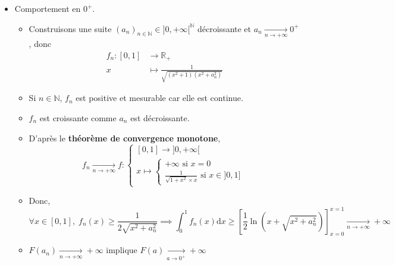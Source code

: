 \begin{myproof}{}{}
\begin{itemize}

  \item Comportement en $0 ^{+}$. 




  \begin{itemize}
    \item Construisons une suite $(a_n) _{n \in \mathbb{N}} \in ]0,+ \infty[ ^{\mathbb{N}}$ décroissante et $a_n \underset{n \to + \infty}{\longrightarrow} 0 ^{+}$, donc
        \begin{align}
          f_n : [0, 1] &\to \mathbb{R}_+ \\ 
          x &\mapsto \frac {1}{\sqrt{(x ^{2}+1 ) (x ^{2}+ a_n ^{2})}}            \end{align}

      \item Si $n \in \mathbb{N}$, $f_n$ est positive et mesurable car elle est continue. 
      \item $f_n$ est croissante comme $a_n$ est décroissante. 
      \item D'après le \textbf{théorème de convergence monotone}, 
        \begin{equation}
          f_n \underset{n \to +\infty}{\longrightarrow} f : \begin{cases}
            [0,1] \to ]0, + \infty[ \\ x \mapsto  \begin{cases}
            + \infty \text{ si } x = 0 \\ 
            \frac{1}{\sqrt{1 + x ^{2}} \times x} \text{ si } x \in ]0, 1]
          \end{cases}
          \end{cases}       
        \end{equation}

     \item Donc, 
       \begin{equation}
         \forall x\in [0,1], \; f_n(x) \ge \frac{1}{2 \sqrt{x ^{2}+ a_n ^{2}}}  \implies \int_{0}^{1} f_n(x) \mathrm{d}x \ge \left[ \frac{1}{2} \ln (x + \sqrt{x ^{2}+ a_n ^{2}}) \right] _{x=0} ^{x=1}   \underset{n \to + \infty}{\longrightarrow}  + \infty
       \end{equation}

      \item $F(a_n)  \underset{n \to + \infty}{\longrightarrow} + \infty$ implique $F(a)  \underset{a \to 0  ^{+}}{\longrightarrow}  + \infty$




\end{itemize}
\end{itemize}
\end{myproof}
